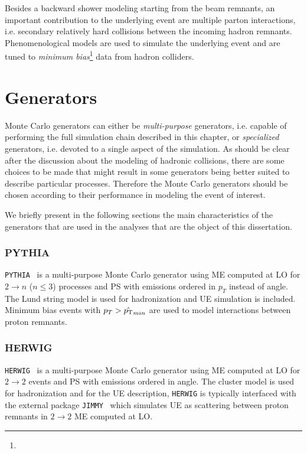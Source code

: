 Besides a backward shower modeling starting from the beam remnants, an
important contribution to the underlying event are multiple parton interactions,
i.e. secondary relatively hard collisions between the incoming hadron remnants.
Phenomenological models are used to simulate the underlying event
and are tuned to {\it minimum bias}\footnote{} 
data from hadron colliders. 


\section{Generators}\label{sec:generators}

Monte Carlo generators can either be {\it multi-purpose} generators,
i.e. capable of performing the full simulation chain described in this chapter,
or {\it specialized} generators, i.e. devoted to a single aspect of the
simulation. As should be clear after the discussion about the modeling
of hadronic collisions, there are some choices to be made that might result
in some generators 
being better suited 
to describe particular processes. Therefore
the Monte Carlo generators should be chosen according to their performance
in modeling the event of interest.

We briefly present in the following sections the main characteristics of the generators
that are used in the analyses that are the object of this dissertation.


\subsubsection*{PYTHIA}

\texttt{PYTHIA}~\cite{PYTHIA} is a multi-purpose Monte Carlo generator
using ME computed at LO for $2 \to n$ ($n\leq 3$) processes and PS with emissions
ordered in $p_T$ instead of angle. The Lund string model is used for hadronization
and UE simulation is included.
Minimum bias events with $p_T>\hat{\pt}_{min}$ are used to model interactions
between proton remnants.


\subsubsection*{HERWIG}

\texttt{HERWIG}~\cite{HERWIG} is a multi-purpose Monte Carlo generator
using ME computed at LO for $2 \to 2$ events and PS with emissions ordered in angle. 
The cluster model is used for hadronization and for the UE description, \texttt{HERWIG}
is typically interfaced with the external package \texttt{JIMMY}~\cite{jimmy} which
simulates UE as scattering between proton remnants in  $2 \to 2$ ME computed at LO.


